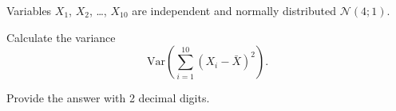 
\begin{question}
Variables \(X_1\), \(X_2\), \ldots, \(X_{10}\) are independent and normally distributed \(\mathcal{N}(4; 1)\).

Calculate the variance
\[
\mathrm{Var}\left(\sum_{i=1}^{10}(X_i - \bar X)^2\right).
\]

Provide the answer with 2 decimal digits.
\end{question}


